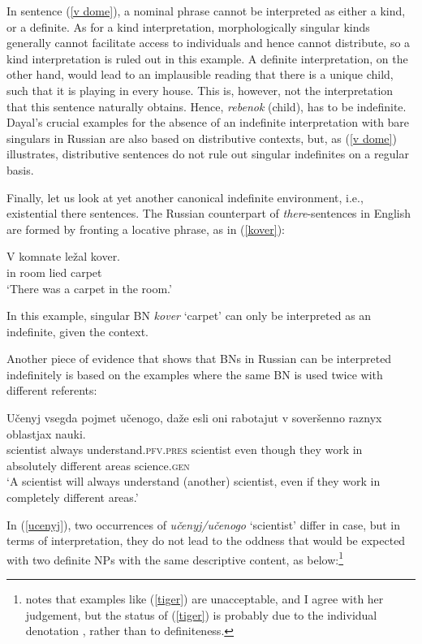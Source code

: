 \documentclass[output=paper,colorlinks,citecolor=brown]{langscibook}
\begin{document}
\noindent In sentence (\ref{v dome}), a nominal phrase cannot be interpreted as either a kind, or a definite. As for a kind interpretation, morphologically singular kinds generally cannot facilitate access to individuals \citep[cf.][]{krifkaetal} and hence cannot distribute, so a kind interpretation is ruled out in this example. A definite interpretation, on the other hand, would lead to an implausible reading that there is a unique child, such that it is playing in every house. This is, however, not the interpretation that this sentence naturally obtains. Hence, \textit{rebenok} (child), has to be indefinite. Dayal's crucial examples for the absence of an indefinite interpretation with bare singulars in Russian are also based on distributive contexts,  but, as (\ref{v dome}) illustrates, distributive sentences do not rule out singular indefinites on a regular basis. 

Finally, let us look at yet another canonical indefinite environment, i.e., existential there sentences. The Russian counterpart of \textit{there}-sentences in English are formed by fronting a locative phrase, as in (\ref{kover}): 

\ea \label{kover} \gll 
V komnate le\v{z}al  kover. \\
in room			lied 		carpet \\
\glt `There was a carpet in the room.'
\z

\noindent In this example, singular BN \textit{kover} `carpet' can only be interpreted as an indefinite, given the context. 

Another piece of evidence that shows that BNs in Russian can be interpreted indefinitely is based on the examples where the same BN is used twice with different referents: 

\ea \label{ucenyj} \gll
U\v{c}enyj vsegda pojmet u\v{c}enogo, da\v{z}e esli oni rabotajut v sover\v{s}enno raznyx oblastjax nauki. \\
scientist always understand.\textsc{pfv.pres} scientist even though they work in absolutely different areas science.\textsc{gen}\\
\glt `A scientist will always understand (another) scientist, even if they work in completely different areas.'
\z

\noindent In (\ref{ucenyj}), two occurrences of \textit{u\v{c}enyj/u\v{c}enogo} `scientist' differ in case, but in terms of interpretation, they do not lead to the oddness that would be expected with two definite NPs with the same descriptive content, as below:\footnote{\citet{dayal04}
    notes that examples like (\ref{tiger}) are unacceptable, and I agree with her judgement, but the status of (\ref{tiger}) is probably due to the individual denotation \citep[][]{lobner85}, rather than to definiteness.
    \glt{}
    \z\vspace*{1em}
}
\end{document}
